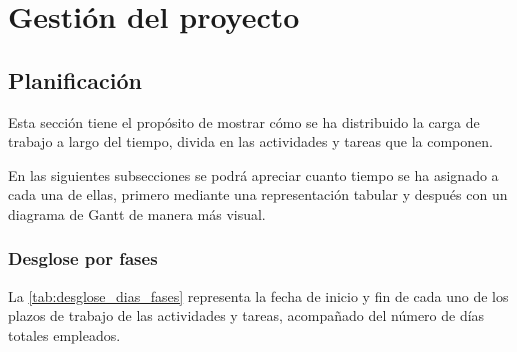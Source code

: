 \chapter{Gestión del proyecto}
\label{ch:gestion}
\section{Planificación}\label{sec:planificacion}
Esta sección tiene el propósito de mostrar cómo se ha distribuido la carga de trabajo a largo del tiempo, divida en las actividades y tareas que la componen.

En las siguientes subsecciones se podrá apreciar cuanto tiempo se ha asignado a cada una de ellas, primero mediante una representación tabular y después con un diagrama de Gantt de manera más visual.

\subsection{Desglose por fases}\label{subsec:desglose_fases}
La \autoref{tab:desglose_dias_fases} representa la fecha de inicio y fin de cada uno de los plazos de trabajo de las actividades y tareas, acompañado del número de días totales empleados.

